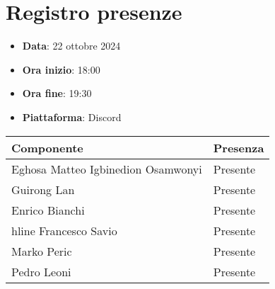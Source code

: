 \documentclass[a4paper, 12pt]{article}
\begin{document}
\section{Registro presenze}
   \begin{itemize}
        \item[] \textbf{Data}: 22 ottobre 2024
        \item[] \textbf{Ora inizio}: 18:00
        \item[] \textbf{Ora fine}: 19:30
        \item[] \textbf{Piattaforma}: Discord	
    \end{itemize}
\begin{table}[!h]
    \centering
    {\renewcommand{\arraystretch}{2}
    \begin{tabularx}{\textwidth}{| X | X |}
        \hline
            \textbf{\large Componente} & 
            \textbf{\large Presenza} \\ 
        \hline
        \hline
            Eghosa Matteo Igbinedion Osamwonyi&
            Presente \\
        \hline 
            Guirong Lan&
            Presente \\
        \hline 
            Enrico Bianchi&
            Presente \\
        hline 
            Francesco Savio&
            Presente \\
        \hline 
            Marko Peric&
            Presente \\
        \hline 
            Pedro Leoni&
            Presente \\
        \hline 
            
    \end{tabularx}}
\end{table}

\newpage
\end{document}
